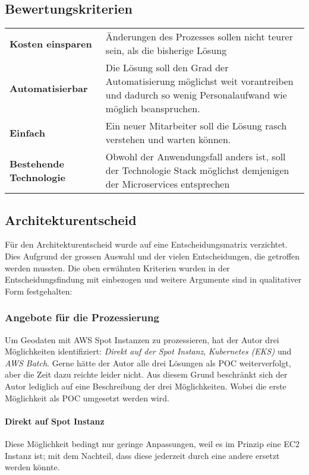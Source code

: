 \subsection{Bewertungskriterien}
\begin{tabular}{p{}p{}}
    \textbf{Kosten einsparen} & Änderungen des Prozesses sollen nicht teurer sein, als die bisherige Lösung\\
    \textbf{Automatisierbar} & Die Lösung soll den Grad der Automatisierung möglichst weit vorantreiben und dadurch so wenig Personalaufwand wie möglich beanspruchen.\\
    \textbf{Einfach} & Ein neuer Mitarbeiter soll die Lösung rasch verstehen und warten können.\\
    \textbf{Bestehende Technologie} & Obwohl der Anwendungsfall anders ist, soll der Technologie Stack möglichst demjenigen der Microservices entsprechen\\
\end{tabular}

\subsection{Architekturentscheid}
Für den Architekturentscheid wurde auf eine Entscheidungsmatrix verzichtet. Dies Aufgrund der grossen Auswahl und der vielen Entscheidungen, die getroffen werden mussten. Die oben erwähnten Kriterien wurden in der Entscheidungsfindung mit einbezogen und weitere Argumente sind in qualitativer Form festgehalten:

\subsubsection{Angebote für die Prozessierung}
Um Geodaten mit AWS Spot Instanzen zu prozessieren, hat der Autor drei Möglichkeiten identifiziert: \emph{Direkt auf der Spot Instanz}, \emph{Kubernetes (EKS)} und \emph{AWS Batch}. Gerne hätte der Autor alle drei Lösungen als POC weiterverfolgt, aber die Zeit dazu reichte leider nicht. Aus diesem Grund beschränkt sich der Autor lediglich auf eine Beschreibung der drei Möglichkeiten. Wobei die erste Möglichkeit als POC umgesetzt werden wird.

\paragraph{Direkt auf Spot Instanz}
Diese Möglichkeit bedingt nur geringe Anpassungen, weil es im Prinzip eine EC2 Instanz ist; mit dem Nachteil, dass diese jederzeit durch eine andere ersetzt werden könnte.

